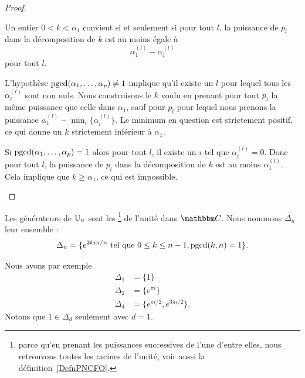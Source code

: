 \begin{proof}
\begin{subproof}
        Un entier \( 0<k<\alpha_1\) convient si et seulement si pour tout \( l\), la puissance de \( p_l\) dans la décomposition de \( k\) est au moins égale à
        \begin{equation}
            \alpha_1^{(l)}-\alpha_i^{(l)}
        \end{equation}
        pour tout \( l\).
    \item[Sens direct]
        L'hypothèse \( \operatorname{pgcd}(\alpha_1,\ldots, \alpha_p)\neq 1\) implique qu'il existe un \( l\) pour lequel tous les \( \alpha_i^{(l)}\) sont non nuls. Nous construisons le \( k\) voulu en prenant pour tout \( p_i\) la même puissance que celle dans \( \alpha_1\), sauf pour \( p_l\) pour lequel nous prenons la puissance \(  \alpha_1^{(l)}-\min_i\{   \alpha_i^{(l)} \} \). Le minimum en question est strictement positif, ce qui donne un \( k\) strictement inférieur à \( \alpha_1\).
    \item[Sens réciproque]
        Si \( \operatorname{pgcd}(\alpha_1,\ldots, \alpha_p)=1\) alors pour tout \( l\), il existe un \( i\) tel que \( \alpha_i^{(l)}=0\). Donc pour tout \( l\), la puissance de \( p_l\) dans la décomposition de \( k\) est au moins \( \alpha_1^{(l)}\). Cela implique que \( k\geq \alpha_1\), ce qui est impossible.
    \end{subproof}
\end{proof}

\begin{definition}\label{DefLYGTooFPOYGZ}
    Les générateurs de \( \operatorname{U}_n\) sont les \footnote{parce qu'en prenant les puissances successives de l'une d'entre elles, nous retrouvons toutes les racines de l'unité, voir aussi la définition~\ref{DefnPNCFO}.} de l'unité dans \( \eC\). Nous nommons \( \Delta_n\) leur ensemble :
\begin{equation}
    \Delta_n=\{  e^{2ki\pi/n}\text{ tel que } 0\leq k\leq n-1,\operatorname{pgcd}(k,n)=1 \}.
\end{equation}
\end{definition}
Nous avons par exemple
\begin{subequations}
    \begin{align}
        \Delta_1&=\{ 1 \}\\
        \Delta_2&=\{  e^{\pi i} \}\\
        \Delta_4&=\{  e^{\pi i/2}, e^{3\pi i/2} \}.
    \end{align}
\end{subequations}
Notons que \( 1\in \Delta_d\) seulement avec \( d=1\).

